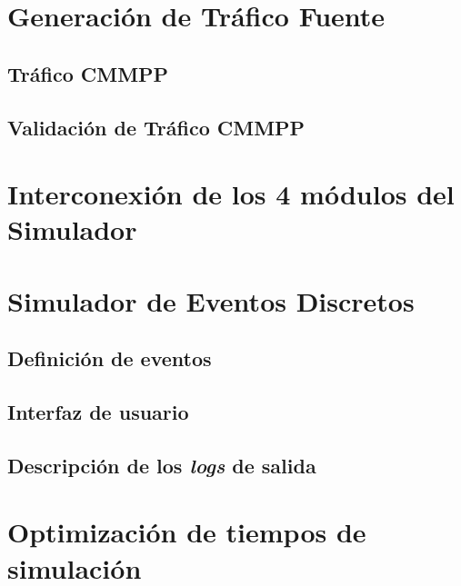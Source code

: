 \section{Generación de Tráfico Fuente}

\subsection{Tráfico CMMPP}
\subsection{Validación de Tráfico CMMPP}


\section{Interconexión de los 4 módulos del Simulador}


\section{Simulador de Eventos Discretos}

\subsection{Definición de eventos}

\subsection{Interfaz de usuario}

\subsection{Descripción de los \textit{logs} de salida}


\section{Optimización de tiempos de simulación}

